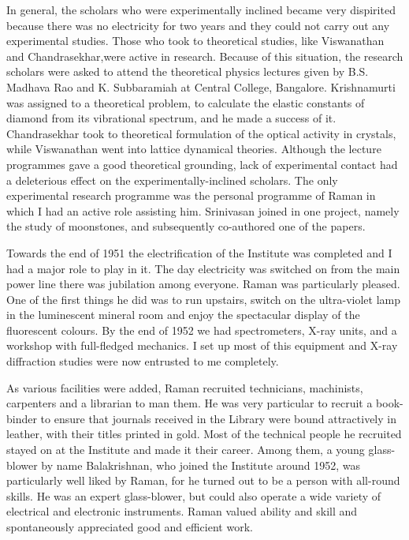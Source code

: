In general, the scholars who were experimentally inclined
became very dispirited because there was no electricity for two
years and they could not carry out any experimental studies.
Those who took to theoretical studies, like Viswanathan and
Chandrasekhar,\break were active in research. Because of this situation,
the research scholars were asked to attend the theoretical physics
lectures given by B.S. Madhava Rao and K. Subbaramiah at
Central College, Bangalore. Krishnamurti was assigned to a
theoretical problem, to calculate the elastic constants of diamond
from its vibrational spectrum, and he made a success of it.
Chandrasekhar took to theoretical formulation of the optical
activity in crystals, while Viswanathan went into lattice dynamical
theories. Although the lecture programmes gave a good theoretical
grounding, lack of experimental contact had a deleterious effect
on the experimentally-inclined scholars. The only experimental
research programme was the personal programme of \hbox{Raman} in
which I had an active role assisting him. Srinivasan joined in one
project, namely the study of moonstones, and subsequently co-authored one of the papers.

Towards the end of 1951 the electrification of the Institute
was completed and I had a major role to play in it. The day
electricity was switched on from the main power line there was
jubilation among everyone. Raman was particularly pleased.
One of the first things he did was to run upstairs, switch on the
ultra-violet lamp in the luminescent mineral room and enjoy the
spectacular display of the fluorescent colours. By the end of 1952
we had spectrometers, X-ray units, and a workshop with full-fledged mechanics. I set up most of this equipment and X-ray
diffraction studies were now entrusted to me completely.

As various facilities were added, Raman recruited technicians, 
machinists, carpenters and a librarian to man them. He was
very particular to recruit a book-binder to ensure that journals
received in the Library were bound attractively in leather, with
their titles printed in gold. Most of the technical people he
recruited stayed on at the Institute and made it their career.
Among them, a young glass-blower by name Balakrishnan, who
joined the Institute around 1952, was particularly well liked by
Raman, for he turned out to be a person with all-round skills.
He was an expert glass-blower, but could also operate a
wide variety of electrical and electronic instruments. Raman
valued ability and skill and spontaneously appreciated good and
efficient work.

